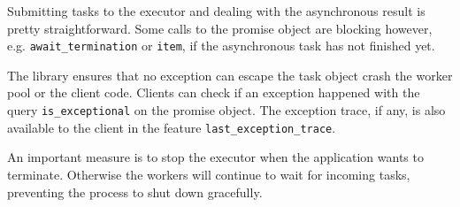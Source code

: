 Submitting tasks to the executor and dealing with the asynchronous result is pretty straightforward.
Some calls to the promise object are blocking however, e.g. \lstinline!await_termination! or \lstinline!item!, if the asynchronous task has not finished yet.

The library ensures that no exception can escape the task object crash the worker pool or the client code.
Clients can check if an exception happened with the query \lstinline!is_exceptional! on the promise object.
The exception trace, if any, is also available to the client in the feature \lstinline!last_exception_trace!.

An important measure is to stop the executor when the application wants to terminate.
Otherwise the workers will continue to wait for incoming tasks, preventing the process to shut down gracefully.
